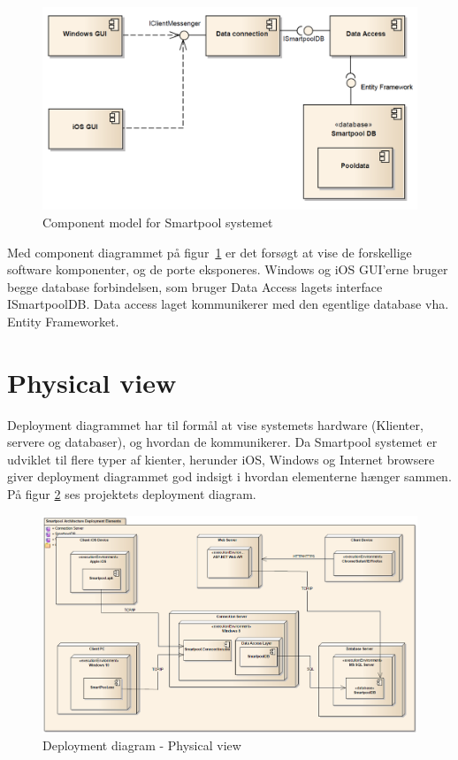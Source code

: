 \begin{figure}
\centering
\includegraphics[width=0.7\linewidth]{figs/arkitektur/componentModel}
\caption{Component model for Smartpool systemet}
\label{fig:componentModel}
\end{figure}

Med component diagrammet på figur~\ref{fig:componentModel} er det forsøgt at vise de forskellige software komponenter, og de porte eksponeres. Windows og iOS GUI'erne bruger begge database forbindelsen, som bruger Data Access lagets interface ISmartpoolDB. Data access laget kommunikerer med den egentlige database vha. Entity Frameworket.

\section{Physical view}
 
Deployment diagrammet har til formål at vise systemets hardware (Klienter, servere og databaser), og hvordan de kommunikerer. Da Smartpool systemet er udviklet til flere typer af kienter, herunder iOS, Windows og Internet browsere giver deployment diagrammet god indsigt i hvordan elementerne hænger sammen.
På figur \ref{fig:deploymentView} ses projektets deployment diagram.

\begin{figure}
	\centering
	\includegraphics[width=\linewidth]{figs/arkitektur/deploymentView.PNG}
	\caption{Deployment diagram - Physical view}
	\label{fig:deploymentView}
\end{figure}

